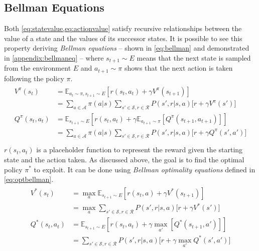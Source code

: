 \subsection{Bellman Equations}

Both \vref{eq:statevalue,eq:actionvalue} satisfy recursive relationships between the value of a state and the values of its successor states. It is possible to see this property deriving \textit{Bellman equations} -- shown in \vref{eq:bellman} and demonstrated in \vref{appendix:bellmaneq} -- where $s_{t+1}\sim \mathit{E}$ means that the next state is sampled from the environment $E$ and $a_{t+1}\sim \pi$ shows that the next action is taken following the policy $\pi$.
\begin{align} \label{eq:bellman}
	\begin{split}
V^\pi(s_t) &= \mathbb{E}_{a_t \sim \pi, s_{t+1} \sim E}[r(s_t, a_t) + \gamma V^\pi(s_{t+1})] \\
		&= \sum_{a \in \mathcal{A}}\pi(a|s)\sum_{s' \in \mathcal{S}, r \in \mathcal{R}}P(s', r | s, a)\big[r + \gamma V^\pi(s')\big]\\
Q^\pi(s_t,a_t) &= \mathbb{E}_{s_{t+1} \sim E}[r(s_t, a_t) + \gamma \mathbb{E}_{ a_{t+1} \sim \pi}[Q^\pi(s_{t+1}, a_{t+1})]]\\
	&= \sum_{a \in \mathcal{A}}\pi(a|s)\sum_{s' \in \mathcal{S}, r \in \mathcal{R}}P(s', r | s, a)\big[r + \gamma Q^\pi(s',a')\big]\\
\end{split}
\end{align}
 $r(s_t, a_t)$ is a placeholder function to represent the reward given the starting state and the action taken.
As discussed above, the goal is to find the optimal policy $\pi^*$ to exploit. It can be done using \textit{Bellman optimality equations} defined in \vref{eq:optbellman}. 
\begin{align} \label{eq:optbellman}
\begin{split}
V^*(s_t) &= \max_{a} \mathbb{E}_{s_{t+1} \sim E}[r(s_t, a) + \gamma V^*(s_{t+1})] \\
		&= \max_{a}\sum_{s' \in \mathcal{S}, r \in \mathcal{R}}P(s', r | s, a)\big[r + \gamma V^*(s')\big]\\
Q^*(s_t,a_t) &= \mathbb{E}_{s_{t+1} \sim E}[r(s_t, a_t) + \gamma \max_{a'}[Q^*(s_{t+1}, a')]]\\
			&= \sum_{s' \in \mathcal{S}, r \in \mathcal{R}}P(s', r | s, a)\big[r + \gamma \max_{a'} Q^*(s',a')\big]\\
\end{split}
\end{align}

